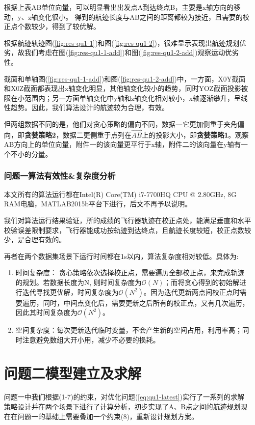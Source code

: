 根据上表AB单位向量，可以明显看出出发点A到达终点B，主要是x轴方向的移动，y、z轴变化很小。
得到的航迹长度与AB之间的距离都较为接近，且需要的校正点个数较少，得到了较优解。

根据航迹轨迹图(\ref{fig:res-qu1-1})和图(\ref{fig:res-qu1-2})，很难显示表现出航迹规划优劣，故我们考虑在图(\ref{fig:res-qu1-1-add})和图(\ref{fig:res-qu1-2-add})观察运动优劣性。

截面和单轴图(\ref{fig:res-qu1-1-add})和图(\ref{fig:res-qu1-2-add})中，一方面，X0Y截面和X0Z截面都表现出x轴变化明显，其他轴变化较小的趋势，同时YOZ截面投影被限在小范围内；另一方面单轴变化中y轴和z轴变化相对较小，x轴逐渐攀升，呈线性趋势。因此，我们算法设计的航迹较为合理，有效。

但两组数据不同的是，他们对贪心策略的偏向不同，数据一它更加侧重于夹角偏向，即\textbf{贪婪策略2}，数据二更侧重于点列在$\overrightarrow{AB}$上的投影大小，即\textbf{贪婪策略1}。观察AB方向上的单位向量，附件一的该向量更平行于x轴，附件二的该向量在y轴有一个不小的分量。

\subsubsection{问题一算法有效性\&复杂度分析}
本文所有的算法运行都在Intel(R) Core(TM) i7-7700HQ CPU @ 2.80GHz, 8G RAM电脑，MATLAB2015b平台下进行，后文不再予以说明。

我们对算法运行结果验证，所的成绩的飞行器轨迹在校正点处，能满足垂直和水平校验误差限制要求，飞行器能成功按轨迹到达终点，且航迹长度较短，校正点数较少，是合理有效的。

再者在两个数据集场景下运行时间都在1s以内，算法复杂度相对较低。具体为:
\begin{enumerate}
    \item 时间复杂度： 贪心策略依次选择校正点，需要遍历全部校正点，来完成轨迹的规划。若数据长度为N, 则时间复杂度为$\mathcal{O}(N)$；而将贪心得到的初始解进行迭代寻找更优解，时间复杂度为$\mathcal{O}(N^2)$。因为迭代更新两点间校正点时需要遍历，同时，中间点变化后，需要更新之后所有的校正点，又有几次遍历，因此其时间复杂度为$\mathcal{O}(N^2)$。
	\item 空间复杂度：每次更新迭代临时变量，不会产生新的空间占用，利用率高；同时注意避免数组大开小用，减少不必要的损耗。
\end{enumerate}




\newpage
\section{问题二模型建立及求解}
问题一中我们根据(1-7)的约束，对优化问题(\ref{eq:qu1-latest})实行了一系列的求解策略设计并在两个场景下进行了计算分析，初步实现了A、B点之间的航迹规划现在在问题一的基础上需要叠加一个约束(8)，重新设计规划方案。

